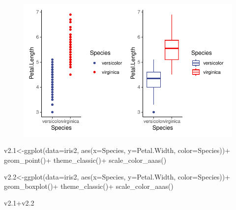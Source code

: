\documentclass[
  letterpaper,
  DIV=11,
  numbers=noendperiod]{scrartcl}
\newenvironment{Shaded}{\begin{snugshade}}{\end{snugshade}}
\newcommand{\AttributeTok}[1]{\textcolor[rgb]{0.40,0.45,0.13}{#1}}
\newcommand{\FloatTok}[1]{\textcolor[rgb]{0.68,0.00,0.00}{#1}}
\newcommand{\FunctionTok}[1]{\textcolor[rgb]{0.28,0.35,0.67}{#1}}
\newcommand{\NormalTok}[1]{\textcolor[rgb]{0.00,0.23,0.31}{#1}}
\newcommand{\OtherTok}[1]{\textcolor[rgb]{0.00,0.23,0.31}{#1}}
\newcommand{\SpecialCharTok}[1]{\textcolor[rgb]{0.37,0.37,0.37}{#1}}
\begin{document}
\begin{figure}[H]

{\centering \includegraphics{cor_reg_chi_files/figure-pdf/unnamed-chunk-29-1.pdf}

}

\end{figure}

\begin{Shaded}
\begin{Highlighting}[]
\NormalTok{v2}\FloatTok{.1}\OtherTok{\textless{}{-}}\FunctionTok{ggplot}\NormalTok{(}\AttributeTok{data=}\NormalTok{iris2, }\FunctionTok{aes}\NormalTok{(}\AttributeTok{x=}\NormalTok{Species, }\AttributeTok{y=}\NormalTok{Petal.Width, }\AttributeTok{color=}\NormalTok{Species))}\SpecialCharTok{+}
  \FunctionTok{geom\_point}\NormalTok{()}\SpecialCharTok{+}
  \FunctionTok{theme\_classic}\NormalTok{()}\SpecialCharTok{+}
  \FunctionTok{scale\_color\_aaas}\NormalTok{()}

\NormalTok{v2}\FloatTok{.2}\OtherTok{\textless{}{-}}\FunctionTok{ggplot}\NormalTok{(}\AttributeTok{data=}\NormalTok{iris2, }\FunctionTok{aes}\NormalTok{(}\AttributeTok{x=}\NormalTok{Species, }\AttributeTok{y=}\NormalTok{Petal.Width, }\AttributeTok{color=}\NormalTok{Species))}\SpecialCharTok{+}
  \FunctionTok{geom\_boxplot}\NormalTok{()}\SpecialCharTok{+}
  \FunctionTok{theme\_classic}\NormalTok{()}\SpecialCharTok{+}
  \FunctionTok{scale\_color\_aaas}\NormalTok{()}

\NormalTok{v2}\FloatTok{.1}\SpecialCharTok{+}\NormalTok{v2}\FloatTok{.2}
\end{Highlighting}
\end{Shaded}
\end{document}

